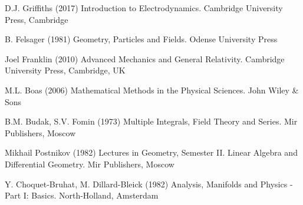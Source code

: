 % 
%

%
% 
% 
%
\begin{thebibliography}{99.}
%
%
%
 D.J. Griffiths (2017)
Introduction to Electrodynamics. Cambridge University Press, Cambridge

 B. Felsager (1981)
Geometry, Particles and Fields. Odense University Press

 Joel Franklin (2010)
Advanced Mechanics and General Relativity. Cambridge University Press, Cambridge, UK

 M.L. Boas (2006)
Mathematical Methods in the Physical Sciences. John Wiley \& Sons

 B.M. Budak, S.V. Fomin (1973)
Multiple Integrals, Field Theory and Series. Mir Publishers, Moscow

 Mikhail Postnikov (1982)
Lectures in Geometry, Semester II. Linear Algebra and Differential Geometry. Mir Publishers, Moscow

 Y. Choquet-Bruhat, M. Dillard-Bleick (1982)
Analysis, Manifolds and Physics - Part I: Basics. North-Holland, Amsterdam

\end{thebibliography}
